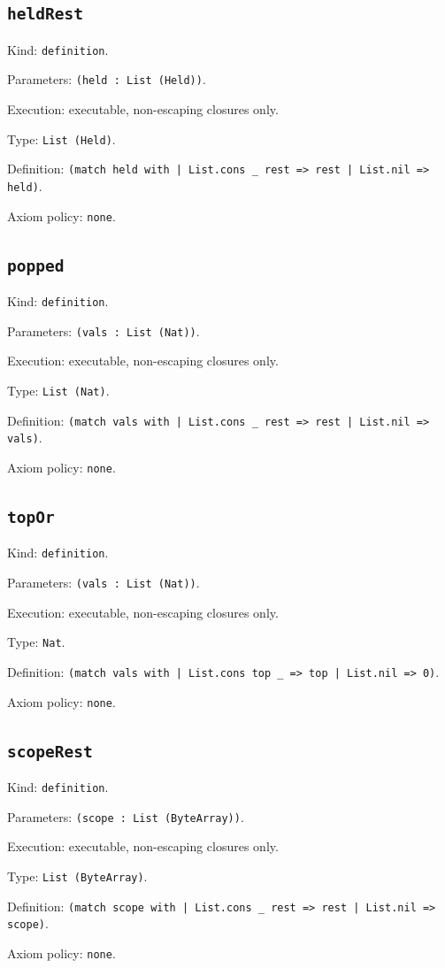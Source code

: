 \documentclass[11pt]{article}
\begin{document}
\subsection*{\texttt{heldRest}}
\noindent Kind: \texttt{definition}.\par
\noindent Parameters: \texttt{(held : List (Held))}.\par
\noindent Execution: executable, non-escaping closures only.\par
\noindent Type: \texttt{List (Held)}.\par
\noindent Definition: \texttt{(match held with | List.cons \_ rest => rest | List.nil => held)}.\par
\noindent Axiom policy: \texttt{none}.\par
\subsection*{\texttt{popped}}
\noindent Kind: \texttt{definition}.\par
\noindent Parameters: \texttt{(vals : List (Nat))}.\par
\noindent Execution: executable, non-escaping closures only.\par
\noindent Type: \texttt{List (Nat)}.\par
\noindent Definition: \texttt{(match vals with | List.cons \_ rest => rest | List.nil => vals)}.\par
\noindent Axiom policy: \texttt{none}.\par
\subsection*{\texttt{topOr}}
\noindent Kind: \texttt{definition}.\par
\noindent Parameters: \texttt{(vals : List (Nat))}.\par
\noindent Execution: executable, non-escaping closures only.\par
\noindent Type: \texttt{Nat}.\par
\noindent Definition: \texttt{(match vals with | List.cons top \_ => top | List.nil => 0)}.\par
\noindent Axiom policy: \texttt{none}.\par
\subsection*{\texttt{scopeRest}}
\noindent Kind: \texttt{definition}.\par
\noindent Parameters: \texttt{(scope : List (ByteArray))}.\par
\noindent Execution: executable, non-escaping closures only.\par
\noindent Type: \texttt{List (ByteArray)}.\par
\noindent Definition: \texttt{(match scope with | List.cons \_ rest => rest | List.nil => scope)}.\par
\noindent Axiom policy: \texttt{none}.\par
\end{document}
